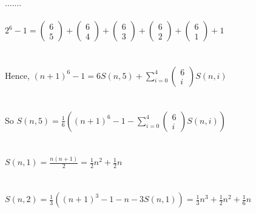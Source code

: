 \documentclass{article}
\begin{document}
\\ \hspace*{\fill} \\
.......
\\ \hspace*{\fill} \\
$2^6 - 1 = \begin{pmatrix}
6\\
5
\end{pmatrix} + \begin{pmatrix}
6\\
4
\end{pmatrix} + \begin{pmatrix}
6\\
3
\end{pmatrix} + \begin{pmatrix}
6\\
2
\end{pmatrix} + \begin{pmatrix}
6\\
1
\end{pmatrix} + 1$\\
\\ \hspace*{\fill} \\
Hence, $(n+1)^6 - 1 = 6S(n,5) + \sum_{i=0}^{4} \begin{pmatrix}
6\\
i
\end{pmatrix} S(n,i)$\\
\\ \hspace*{\fill} \\
So $S(n,5) = \frac{1}{6}((n+1)^6 - 1 - \sum_{i=0}^{4} \begin{pmatrix}
6\\
i
\end{pmatrix} S(n,i))$\\
\\ \hspace*{\fill} \\
$S(n,1) = \frac{n(n+1)}{2} = \frac{1}{2}n^2 + \frac{1}{2}n$\\
\\ \hspace*{\fill} \\
$S(n,2) = \frac{1}{3}((n+1)^3 - 1 - n - 3S(n,1)) = \frac{1}{3}n^3 + \frac{1}{2}n^2 + \frac{1}{6}n$\\
\\ \hspace*{\fill} \\
\end{document}
